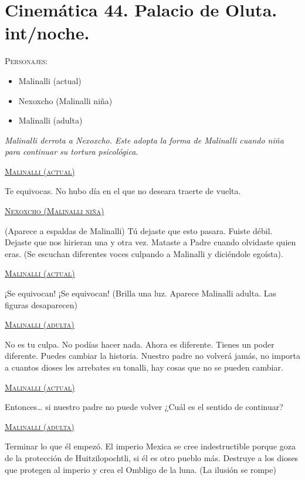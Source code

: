 \documentclass[11pt,letterpaper]{article}
\begin{document}
\section{Cinemática 44. Palacio de Oluta. int/noche. }
 \textsc{Personajes}:
 \begin{itemize}
 \item Malinalli (actual)
\item Nexoxcho (Malinalli niña)
\item Malinalli (adulta)
 \end{itemize}
\textit{Malinalli derrota a Nexoxcho. Este adopta la forma de Malinalli cuando niña para continuar su tortura psicológica.}
\begin{center}
\textsc{\underline{Malinalli (actual)}} 
\\
\par 
Te equivocas. No hubo día en el que no deseara traerte de vuelta. 
\\
\par 
\textsc{\underline{Nexoxcho (Malinalli niña)}}  
\\
\par 
(Aparece a espaldas de Malinalli) Tú dejaste que esto pasara. Fuiste débil. Dejaste que nos hirieran una y otra vez. Mataste a Padre cuando olvidaste quien eras.
(Se escuchan diferentes voces culpando a Malinalli y diciéndole egoísta).
\\
\par 
\textsc{\underline{Malinalli (actual)}} 
\\
\par 
¡Se equivocan! ¡Se equivocan!
(Brilla una luz. Aparece Malinalli adulta. Las figuras desaparecen)
\\
\par 
\textsc{\underline{Malinalli (adulta)}} 
\\
\par 
No es tu culpa. No podías hacer nada. Ahora es diferente. Tienes un poder diferente. Puedes cambiar la historia. Nuestro padre no volverá jamás, no importa a cuantos dioses les arrebates su tonalli, hay cosas que no se pueden cambiar.
\\
\par 
\textsc{\underline{Malinalli (actual)}} 
\\
\par 
Entonces… si nuestro padre no puede volver ¿Cuál es el sentido de continuar?
\\
\par 
\textsc{\underline{Malinalli (adulta)}} 
\\
\par 
Terminar lo que él empezó. El imperio Mexica se cree indestructible porque goza de la protección de Huitzilopochtli, si él es otro pueblo más. Destruye a los dioses que protegen al imperio y crea el Ombligo de la luna.
(La ilusión se rompe) 
\end{center}
\end{document}
